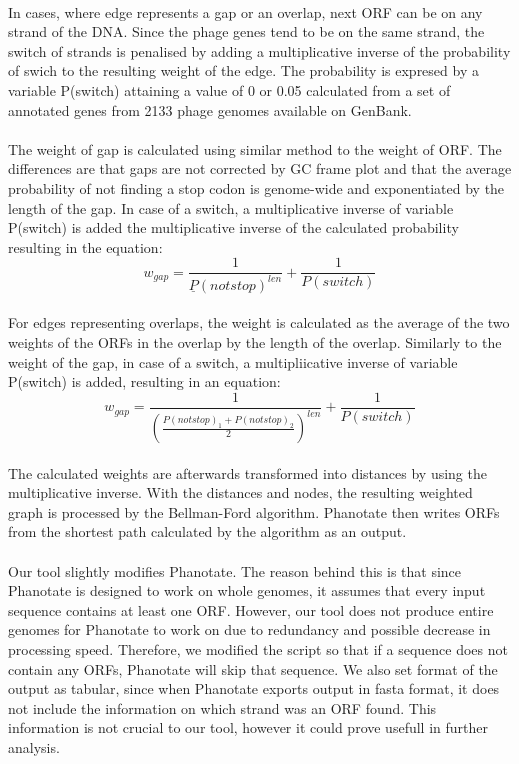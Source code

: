 \paragraph*{}
In cases, where edge represents a gap or an overlap, next ORF can be on any strand of the DNA. Since the phage genes tend to be on the same strand, the switch of strands is penalised by adding a multiplicative inverse of the probability of swich to the resulting weight of the edge. The probability is expresed by a variable P(switch) attaining a value of 0 or 0.05 calculated from a set of annotated genes from 2133 phage genomes available on GenBank.
\paragraph*{}
The weight of gap is calculated using similar method to the weight of ORF. The differences are that gaps are not corrected by GC frame plot and that the average probability of not finding a stop codon is genome-wide and exponentiated by the length of the gap. In case of a switch, a multiplicative inverse of variable P(switch) is added the multiplicative inverse of the calculated probability resulting in the equation:
\[w_{gap} = \frac{1}{\underline{P}(not stop)^{len}} + \frac{1}{P(switch)}\]
\paragraph*{}
For edges representing overlaps, the weight is calculated as the average of the two weights of the ORFs in the overlap by the length of the overlap. Similarly to the weight of the gap, in case of a switch, a multipliicative inverse of variable P(switch) is added, resulting in an equation:
\[w_{gap} = \frac{1}{(\frac{P(not stop)_{1} + P(not stop)_{2}}{2})^{len}} + \frac{1}{P(switch)}\]
\paragraph*{}
The calculated weights are afterwards transformed into distances by using the multiplicative inverse. With the distances and nodes, the resulting weighted graph is processed by the Bellman-Ford algorithm. Phanotate then writes ORFs from the shortest path calculated by the algorithm as an output.
\paragraph*{}
Our tool slightly modifies Phanotate. The reason behind this is that since Phanotate is designed to work on whole genomes, it assumes that every input sequence contains at least one ORF. However, our tool does not produce entire genomes for Phanotate to work on due to redundancy and possible decrease in processing speed. Therefore, we modified the script so that if a sequence does not contain any ORFs, Phanotate will skip that sequence. We also set format of the output as tabular, since when Phanotate exports output in fasta format, it does not include the information on which strand was an ORF found. This information is not crucial to our tool, however it could prove usefull in further analysis.

